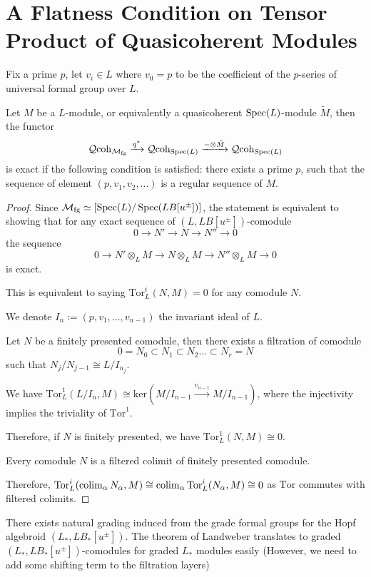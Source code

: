 \section{A Flatness Condition on Tensor Product of Quasicoherent Modules}\label{sec:formalgroups-flatness}

Fix a prime $p$, let $v_i\in L$ where $v_0=p$ to be the coefficient of the $p$-series of universal formal group over $L$.

\begin{theorem}
    \cite{PreLandweber}
    Let $M$ be a $L$-module, or equivalently a quasicoherent $\operatorname{\mathrm{Spec}}(L)$-module $\tilde {M}$, then the functor
    \begin{align*}
        \operatorname{\mathcal{Q}coh}_{\mathcal{M}_{\mathrm{fg}}}\xrightarrow{q^*}\operatorname{\mathcal{Q}coh}_{\operatorname{\mathrm{Spec}}(L)}\xrightarrow{ -\otimes \tilde {M}}\operatorname{\mathcal{Q}coh}_{\operatorname{\mathrm{Spec}}(L)}
    \end{align*}is exact if the following condition is satisfied: there exists a prime $p$, such that the sequence of element $(p,v_1,v_2,...)$ is a regular sequence of $M$.
\end{theorem}

\begin{proof}
    Since $\mathcal{M}_{\mathrm{fg}}\simeq [\operatorname{\mathrm{Spec}}(L)/\operatorname{\mathrm{Spec}}(LB[u^{\pm}])]$, the statement is equivalent to showing that for any exact sequence of $(L, LB[u^{\pm}])$-comodule 
    \[
    0\to N' \to N\to N''\to 0
    \]the sequence
    \[
    0\to N'\otimes_L M\to N\otimes_L M\to  N''\otimes_L M\to 0
    \]is exact.

    This is equivalent to saying $\mathrm{Tor}^i_L(N, M)=0$ for any comodule $N$.

    We denote $I_n:=(p,v_1,...,v_{n-1})$ the invariant ideal of $L$.
    \begin{lemma}
        \cite{PreLandweber}
        Let $N$ be a finitely presented comodule, then there exists a filtration of comodule
        \[
        0=N_0\subset N_1\subset N_2...\subset N_r=N
        \]such that $N_{j}/N_{j-1}\cong L/I_{n_j}$.
    \end{lemma}
    We have $\mathrm{Tor}^1_L(L/I_n, M)\cong \mathrm{ker}(M/I_{n-1}\xrightarrow{v_{n-1}} M/I_{n-1})$, where the injectivity implies the triviality of $\mathrm{Tor}^1$.

    Therefore, if $N$ is finitely presented, we have $\mathrm{Tor}^1_L(N,M)\cong 0$.

    \begin{lemma}
        \cite{PreHoveyComodule}
        Every comodule $N$ is a filtered colimit of finitely presented comodule.
    \end{lemma}
   
    Therefore, $\mathrm{Tor}^i_L(\operatorname{colim}_{\alpha}{N_{\alpha}}, M)\cong \operatorname{colim}_{\alpha}\mathrm{Tor}^i_L({N_{\alpha}}, M)\cong 0$ as $\mathrm{Tor}$ commutes with filtered colimits.
\end{proof}

\begin{remark}
There exists natural grading induced from the grade formal groups for the Hopf algebroid $(L_*, LB_*[u^{\pm}])$. The theorem of Landweber translates to graded $(L_*, LB_*[u^{\pm}])$-comodules for graded $L_*$ modules easily (However, we need to add some shifting term to the filtration layers)
\end{remark}
